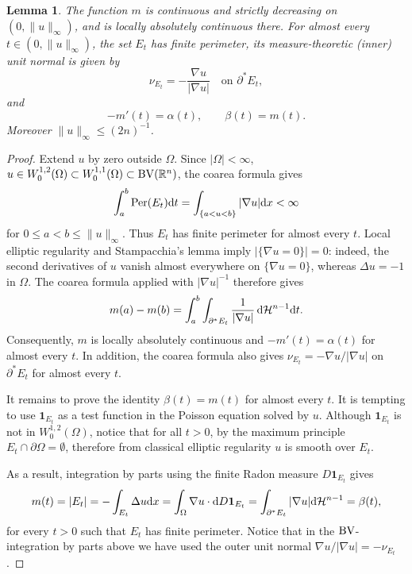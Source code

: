 \documentclass[11pt]{amsart}
\newcommand{\lemmname}{Lemma}
\theoremstyle{plain}
\newtheorem{lemma}[theorem]{\lemmname}
\theoremstyle{definition}
\newcommand{\dHn}{\,\dd\mathcal{H}^{n-1}}
\newcommand{\eqdef}{\overset{\text{def.}}{=}}
\def\dd{{\rm d}}
\newcommand\BV{\mathop{\rm BV}}
\newcommand\Per{\mathop{\rm Per}}
\begin{document}
\begin{lemma}\label{lemma.preliminary_alpha_beta}
The function $m$ is continuous and strictly decreasing on $(0,\|u\|_\infty)$,
and is locally absolutely continuous there. For almost every $t\in(0,\|u\|_\infty)$, the set $E_t$ has finite perimeter, its measure-theoretic (inner) unit normal is given by
\[
  \nu_{E_t}=-\frac{\nabla u}{|\nabla u|}\quad\text{on }\partial^*E_t,
\]
and
 \[
  -m'(t)=\alpha(t),\qquad \beta(t)=m(t).
\]
Moreover $\|u\|_\infty\le(2n)^{-1}$.
\end{lemma}
\begin{proof}
Extend $u$ by zero outside $\Omega$. Since $|\Omega|<\infty$,
$u\in W_0^{1,2}(\Omega)\subset W_0^{1,1}(\Omega)\subset\BV(\mathbb R^n)$, the coarea formula gives
  \[
    \int_a^b\Per(E_t)\dd t =\int_{\{a<u<b\}}|\nabla u|\dd x<\infty
\]
for $0\le a<b\le\|u\|_\infty$. Thus $E_t$ has finite perimeter for almost every $t$. Local elliptic regularity and Stampacchia's lemma imply
$|\{\nabla u=0\}|=0$: indeed, the second derivatives of $u$ vanish almost
everywhere on $\{\nabla u=0\}$, whereas $\Delta u=-1$ in $\Omega$.
The coarea formula applied with $|\nabla u|^{-1}$ therefore gives
\[
  m(a)-m(b)
  =\int_a^b\int_{\partial^*E_t}\frac{1}{|\nabla u|}\dHn\dd t.
\]
Consequently, $m$ is locally absolutely continuous and
$-m'(t)=\alpha(t)$ for almost every $t$. In addition, the coarea formula also gives
$\nu_{E_t}=-\nabla u/|\nabla u|$ on $\partial^*E_t$ for almost every $t$.

It remains to prove the identity $\beta(t) = m(t)$ for almost every $t$. It is tempting to use $\mathbf1_{E_t}$ as a test function in the Poisson equation solved by $u$. Although $\mathbf1_{E_t}$ is not in $W^{1,2}_0(\Omega)$, notice that for all $t > 0$, by the maximum principle $E_t \cap \partial \Omega = \emptyset$, therefore from classical elliptic regularity $u$ is smooth over $E_t$. 

As a result, integration by parts using the finite Radon measure $D\mathbf{1}_{E_t}$ gives
\begin{equation}
    m(t) 
    = |E_t| 
    =  -\int_{E_t} \Delta u \dd x 
    =  \int_{\Omega} \nabla u \cdot \dd D \mathbf{1}_{E_t} 
    =  \int_{\partial^* E_t} |\nabla u| \dd \mathcal{H}^{n-1}
    = \beta(t),
\end{equation}
for every $t > 0$ such that $E_t$ has finite perimeter. Notice that in the $\BV$-integration by parts above we have used the outer unit normal $\nabla u/|\nabla u| = - \nu_{E_t}$. 

%


\end{proof}
\end{document}
